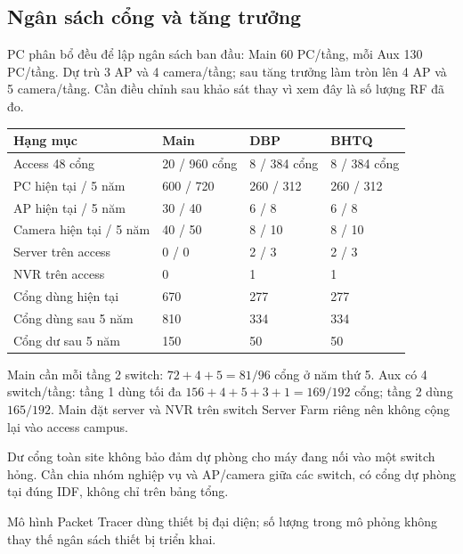\documentclass[
  11pt,
]{article}
\begin{document}
\subsection{Ngân sách cổng và tăng trưởng}
PC phân bổ đều để lập ngân sách ban đầu: Main 60 PC/tầng, mỗi Aux 130 PC/tầng. Dự trù 3 AP và 4 camera/tầng; sau tăng trưởng làm tròn lên 4 AP và 5 camera/tầng. Cần điều chỉnh sau khảo sát thay vì xem đây là số lượng RF đã đo.
\par\noindent
{}
\begin{tabularx}{\linewidth}{@{}lXXX@{}}\toprule
Hạng mục & Main & DBP & BHTQ\\\midrule
Access 48 cổng & 20 / 960 cổng & 8 / 384 cổng & 8 / 384 cổng\\
PC hiện tại / 5 năm & 600 / 720 & 260 / 312 & 260 / 312\\
AP hiện tại / 5 năm & 30 / 40 & 6 / 8 & 6 / 8\\
Camera hiện tại / 5 năm & 40 / 50 & 8 / 10 & 8 / 10\\
Server trên access & 0 / 0 & 2 / 3 & 2 / 3\\
NVR trên access & 0 & 1 & 1\\
Cổng dùng hiện tại & 670 & 277 & 277\\
Cổng dùng sau 5 năm & 810 & 334 & 334\\
Cổng dư sau 5 năm & 150 & 50 & 50\\\bottomrule\end{tabularx}\par

Main cần mỗi tầng 2 switch: $72+4+5=81/96$ cổng ở năm thứ 5. Aux có 4 switch/tầng: tầng 1 dùng tối đa $156+4+5+3+1=169/192$ cổng; tầng 2 dùng $165/192$. Main đặt server và NVR trên switch Server Farm riêng nên không cộng lại vào access campus.

Dư cổng toàn site không bảo đảm dự phòng cho máy đang nối vào một switch hỏng. Cần chia nhóm nghiệp vụ và AP/camera giữa các switch, có cổng dự phòng tại đúng IDF, không chỉ trên bảng tổng.

Mô hình Packet Tracer dùng thiết bị đại diện; số lượng trong mô phỏng không thay thế ngân sách thiết bị triển khai.

\clearpage
\end{document}
